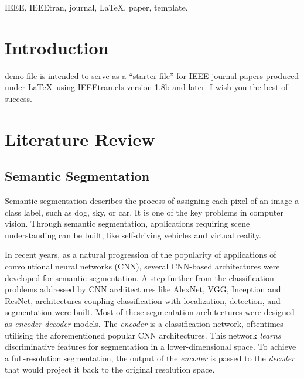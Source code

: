 \documentclass[journal]{IEEEtran}
\begin{document}
\begin{IEEEkeywords}
IEEE, IEEEtran, journal, \LaTeX, paper, template.
\end{IEEEkeywords}






%
\IEEEpeerreviewmaketitle



\section{Introduction}
 demo file is intended to serve as a ``starter file''
for IEEE journal papers produced under \LaTeX\ using
IEEEtran.cls version 1.8b and later.
I wish you the best of success.

\section{Literature Review}
\subsection{Semantic Segmentation}
Semantic segmentation describes the process of assigning each pixel of an image a class label, such as dog, sky, or car. It is one of the key problems in computer vision. Through semantic segmentation, applications requiring scene understanding can be built, like self-driving vehicles and virtual reality. 

In recent years, as a natural progression of the popularity of applications of convolutional neural networks (CNN), several CNN-based architectures were developed for semantic segmentation. A step further from the classification problems addressed by CNN architectures like AlexNet, VGG, Inception and ResNet, architectures coupling classification with localization, detection, and segmentation were built. Most of these segmentation architectures were designed as \textit{encoder-decoder} models. The \textit{encoder} is a classification network, oftentimes utilising the aforementioned popular CNN architectures. This network \textit{learns} discriminative features for segmentation in a lower-dimensional space. To achieve a full-resolution segmentation, the output of the \textit{encoder} is passed to the \textit{decoder} that would project it back to the original resolution space.
\end{document}
